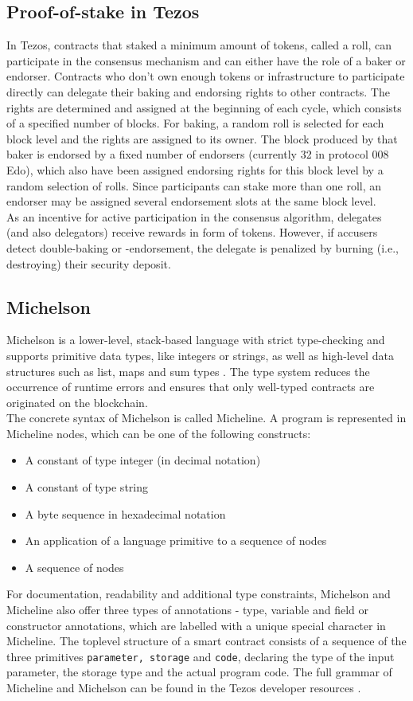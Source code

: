 \subsection{Proof-of-stake in Tezos}
In Tezos, contracts that staked a minimum amount of tokens, called a roll, can participate in the consensus mechanism and can either have the role of a baker or endorser. Contracts who don't own enough tokens or infrastructure to participate directly can delegate their baking and endorsing rights to other contracts. The rights are determined and assigned at the beginning of each cycle, which consists of a specified number of blocks. For baking, a random roll is selected for each block level and the rights are assigned to its owner. The block produced by that baker is endorsed by a fixed number of endorsers (currently 32 in protocol 008 Edo), which also have been assigned endorsing rights for this block level by a random selection of rolls. Since participants can stake more than one roll, an endorser may be assigned several endorsement slots at the same block level. \\
As an incentive for active participation in the consensus algorithm, delegates (and also delegators) receive rewards in form of tokens. However, if accusers detect double-baking or -endorsement, the delegate is penalized by burning (i.e., destroying) their security deposit. \cite{tezos_docs}

\subsection{Michelson}
Michelson is a lower-level, stack-based language with strict type-checking and supports primitive data types, like integers or strings, as well as high-level data structures such as list, maps and sum types \cite{tezos_docs}. The type system reduces the occurrence of runtime errors and ensures that only well-typed contracts are originated on the blockchain. \\
The concrete syntax of Michelson is called Micheline. A program is represented in Micheline nodes, which can be one of the following constructs:
\begin{itemize}
\item A constant of type integer (in decimal notation)
\item A constant of type string
\item A byte sequence in hexadecimal notation
\item An application of a language primitive to a sequence of nodes
\item A sequence of nodes
\end{itemize}
For documentation, readability and additional type constraints, Michelson and Micheline also offer three types of annotations - type, variable and field or constructor annotations, which are labelled with a unique special character in Micheline. The toplevel structure of a smart contract consists of a sequence of the three primitives \texttt{parameter, storage} and \texttt{code}, declaring the type of the input parameter, the storage type and the actual program code. The full grammar of Micheline and Michelson can be found in the Tezos developer resources \cite{tezos_docs}.

